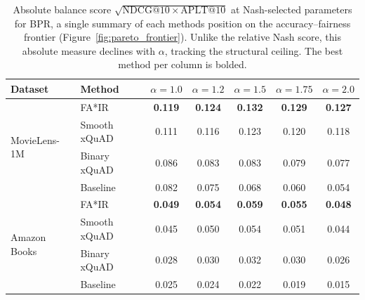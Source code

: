 \begin{table}[htbp]
\centering
\caption{Absolute balance score $\sqrt{\mathrm{NDCG@10}\times\mathrm{APLT@10}}$ at Nash-selected parameters for BPR, a single summary of each methods position on the accuracy--fairness frontier (Figure~\ref{fig:pareto_frontier}). Unlike the relative Nash score, this absolute measure declines with $\alpha$, tracking the structural ceiling. The best method per column is bolded.}
\label{tab:pareto_balance}
\begin{tabular}{llccccc}
\toprule
Dataset & Method & $\alpha=1.0$ & $\alpha=1.2$ & $\alpha=1.5$ & $\alpha=1.75$ & $\alpha=2.0$ \\
\midrule
\multirow{4}{*}{MovieLens-1M} & FA*IR & \textbf{0.119} & \textbf{0.124} & \textbf{0.132} & \textbf{0.129} & \textbf{0.127} \\
\rowcolor{gray!6}  & Smooth xQuAD & 0.111 & 0.116 & 0.123 & 0.120 & 0.118 \\
 & Binary xQuAD & 0.086 & 0.083 & 0.083 & 0.079 & 0.077 \\
\rowcolor{gray!6}  & Baseline & 0.082 & 0.075 & 0.068 & 0.060 & 0.054 \\
\midrule
\multirow{4}{*}{Amazon Books} & FA*IR & \textbf{0.049} & \textbf{0.054} & \textbf{0.059} & \textbf{0.055} & \textbf{0.048} \\
\rowcolor{gray!6}  & Smooth xQuAD & 0.045 & 0.050 & 0.054 & 0.051 & 0.044 \\
 & Binary xQuAD & 0.028 & 0.030 & 0.032 & 0.030 & 0.026 \\
\rowcolor{gray!6}  & Baseline & 0.025 & 0.024 & 0.022 & 0.019 & 0.015 \\
\bottomrule
\end{tabular}
\end{table}
